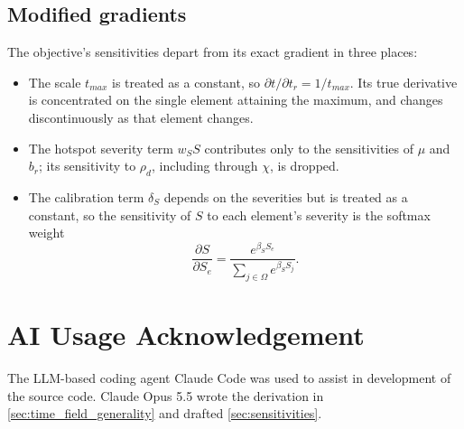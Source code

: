 \documentclass{article}
\let\oldtodo\todo %
\renewcommand{\todo}[1]{\oldtodo[inline]{\detokenize{#1}}}
\begin{document}
\subsection{Modified gradients}
The objective's sensitivities depart from its exact gradient in three places:
\begin{itemize}
    \item The scale $t_{max}$ is treated as a constant, so $\partial t / \partial t_r = 1 / t_{max}$. Its true derivative is concentrated on the single element attaining the maximum, and changes discontinuously as that element changes.
    \item The hotspot severity term $w_S S$ contributes only to the sensitivities of $\mu$ and $b_r$; its sensitivity to $\rho_d$, including through $\chi$, is dropped.
    \item The calibration term $\delta_S$ depends on the severities but is treated as a constant, so the sensitivity of $S$ to each element's severity is the softmax weight
          \[
              \frac{\partial S}{\partial S_e} = \frac{e^{\beta_S S_e}}{\sum_{j \in \Omega} e^{\beta_S S_j}}.
          \]
\end{itemize}

\section{AI Usage Acknowledgement}
The LLM-based coding agent Claude Code was used to assist in development of the source code. Claude Opus 5.5 wrote the derivation in \autoref{sec:time_field_generality} and drafted \autoref{sec:sensitivities}.

\printbibliography
\end{document}
